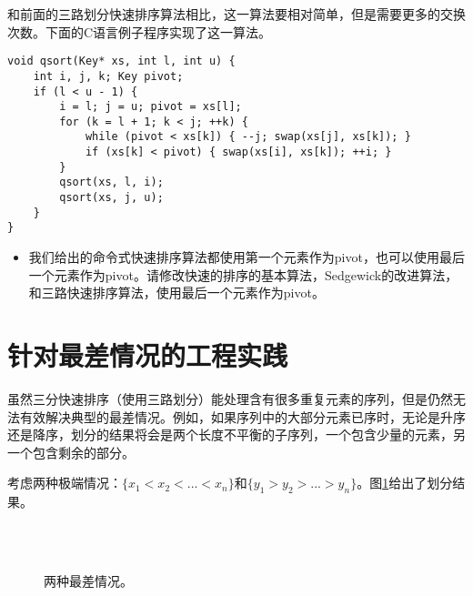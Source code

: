 \documentclass[UTF8]{article}
\begin{document}
和前面的三路划分快速排序算法相比，这一算法要相对简单，但是需要更多的交换次数。下面的C语言例子程序实现了这一算法。

\lstset{language=C}
\begin{lstlisting}
void qsort(Key* xs, int l, int u) {
    int i, j, k; Key pivot;
    if (l < u - 1) {
        i = l; j = u; pivot = xs[l];
        for (k = l + 1; k < j; ++k) {
            while (pivot < xs[k]) { --j; swap(xs[j], xs[k]); }
            if (xs[k] < pivot) { swap(xs[i], xs[k]); ++i; }
        }
        qsort(xs, l, i);
        qsort(xs, j, u);
    }
}
\end{lstlisting}

\begin{Exercise}
\begin{itemize}
\item 我们给出的命令式快速排序算法都使用第一个元素作为pivot，也可以使用最后一个元素作为pivot。请修改快速的排序的基本算法，Sedgewick的改进算法，和三路快速排序算法，使用最后一个元素作为pivot。
\end{itemize}
\end{Exercise}

\section{针对最差情况的工程实践}

虽然三分快速排序（使用三路划分）能处理含有很多重复元素的序列，但是仍然无法有效解决典型的最差情况。例如，如果序列中的大部分元素已序时，无论是升序还是降序，划分的结果将会是两个长度不平衡的子序列，一个包含少量的元素，另一个包含剩余的部分。

考虑两种极端情况：$\{ x_1 < x_2 < ... < x_n\}$和$\{ y_1 > y_2 > ... > y_n\}$。图\ref{fig:worst-cases-1}给出了划分结果。

\begin{figure}[htbp]
   \centering
    \\
    \\
   \caption{两种最差情况。}
   \label{fig:worst-cases-1}
\end{figure}
\end{document}
